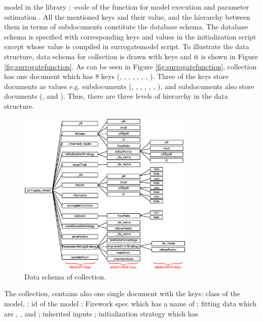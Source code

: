 model in the library {\libraryName}; {\Clang}-code of the function for model
execution and parameter estimation {\Ccode}.  All the mentioned keys and their
value, and the hierarchy between them in terms of subdocuments constitute the
database schema.  The database schema is specified with corresponding keys and
values in the initialization script except {\libraryName} whose value is
compiled in surrogatemodel script.  To illustrate the data structure, data
schema for {\surrogateFunction} collection is drawn with keys and it is shown in
Figure \ref{fig:surrogatefunction}.
%
As can be seen in Figure \ref{fig:surrogatefunction}, {\surrogateFunction}
collection has one document which has 8 keys ({\id}, {\cls}, {},
{\functionName}, {\outputs}, {\libraryName}, {\params}, {\Ccode}).  Three of the
keys store documents as values e.g. subdocuments ({\pZero}, {\rhoZero},
{\pOneByPzero}, {\diameter}, {\flowRate}, {\paramOne}, {\paramTwo}), and
subdocuments also store documents ({\Min}, {\Max} and {\argPos}).  Thus, there
are three levels of hierarchy in the data structure.
%
\begin{figure}
  \centering
  \includegraphics[width=0.75\textwidth,keepaspectratio=true]{./Content/Figures/surrogate_model.eps}
  \caption{Data schema of {\surrogateModel} collection.}
  \label{fig:surrogatemodel}
\end{figure}
%
The collection, {\surrogateModel} contains also one single document with the
keys: class of the model, {\cls}; id of the model {\id}; Firework spec
{\exactTask} which has a name of {\fwname}; fitting data {\fitData} which are
{\pZero}, {\rhoZero}, {\pOneByPzero} and {\diameter}; inherited inputs
{\inheritedInputs}; initialization strategy {\initializationStrategy} which has
